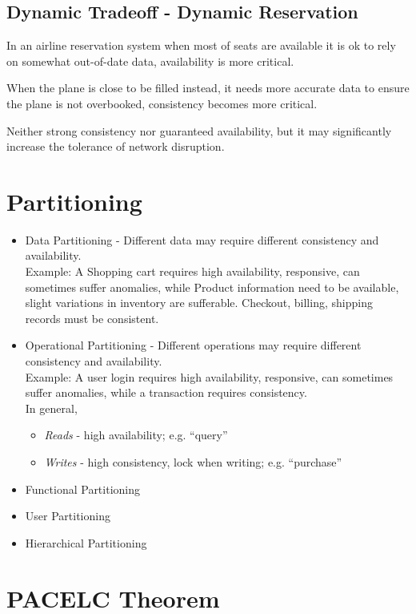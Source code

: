 \subsection{Dynamic Tradeoff - Dynamic Reservation}
In an airline reservation system when most of seats are available it is ok to rely on somewhat out-of-date data, availability
is more critical.

When the plane is close to be filled instead, it needs
more accurate data to ensure the plane is not
overbooked, consistency becomes more critical.

Neither strong consistency nor guaranteed
availability, but it may significantly increase the
tolerance of network disruption.

\section{Partitioning}
\begin{itemize}
	\item Data Partitioning - Different data may require different
   consistency and availability.\\
   Example:
   A Shopping cart requires high availability, responsive, can
sometimes suffer anomalies, while Product information need to be available, slight variations in inventory are sufferable.
Checkout, billing, shipping records must be consistent.
	\item Operational Partitioning - Different operations may require different consistency and availability.\\
   Example:
   A user login requires high availability, responsive, can sometimes suffer anomalies, while a transaction requires consistency.\\
   In general,
   \begin{itemize}
   	\item \textit{Reads} -  high availability; e.g. ``query''
	   \item \textit{Writes} -  high consistency, lock when writing; e.g. ``purchase''
   \end{itemize}
	\item Functional Partitioning
	\item User Partitioning
	\item Hierarchical Partitioning
\end{itemize}


\section{PACELC Theorem}

